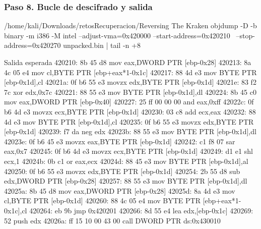 \documentclass[11pt,a4paper]{article}
\begin{document}
\subsubsection*{Paso 8. Bucle de descifrado y salida}
\begin{comando}{/home/kali/Downloads/retosRecuperacion/Reversing The Kraken}
objdump -D -b binary -m i386 -M intel --adjust-vma=0x420000 --start-address=0x420210 \
  --stop-address=0x420270 unpacked.bin | tail -n +8
\end{comando}
\begin{salidan}{Salida esperada}
  420210:       8b 45 d8                mov    eax,DWORD PTR [ebp-0x28]
  420213:       8a 4c 05 e4             mov    cl,BYTE PTR [ebp+eax*1-0x1c]
  420217:       88 4d e3                mov    BYTE PTR [ebp-0x1d],cl
  42021a:       0f b6 55 e3             movzx  edx,BYTE PTR [ebp-0x1d]
  42021e:       83 f2 7c                xor    edx,0x7c
  420221:       88 55 e3                mov    BYTE PTR [ebp-0x1d],dl
  420224:       8b 45 c0                mov    eax,DWORD PTR [ebp-0x40]
  420227:       25 ff 00 00 00          and    eax,0xff
  42022c:       0f b6 4d e3             movzx  ecx,BYTE PTR [ebp-0x1d]
  420230:       03 c8                   add    ecx,eax
  420232:       88 4d e3                mov    BYTE PTR [ebp-0x1d],cl
  420235:       0f b6 55 e3             movzx  edx,BYTE PTR [ebp-0x1d]
  420239:       f7 da                   neg    edx
  42023b:       88 55 e3                mov    BYTE PTR [ebp-0x1d],dl
  42023e:       0f b6 45 e3             movzx  eax,BYTE PTR [ebp-0x1d]
  420242:       c1 f8 07                sar    eax,0x7
  420245:       0f b6 4d e3             movzx  ecx,BYTE PTR [ebp-0x1d]
  420249:       d1 e1                   shl    ecx,1
  42024b:       0b c1                   or     eax,ecx
  42024d:       88 45 e3                mov    BYTE PTR [ebp-0x1d],al
  420250:       0f b6 55 e3             movzx  edx,BYTE PTR [ebp-0x1d]
  420254:       2b 55 d8                sub    edx,DWORD PTR [ebp-0x28]
  420257:       88 55 e3                mov    BYTE PTR [ebp-0x1d],dl
  42025a:       8b 45 d8                mov    eax,DWORD PTR [ebp-0x28]
  42025d:       8a 4d e3                mov    cl,BYTE PTR [ebp-0x1d]
  420260:       88 4c 05 e4             mov    BYTE PTR [ebp+eax*1-0x1c],cl
  420264:       eb 9b                   jmp    0x420201
  420266:       8d 55 e4                lea    edx,[ebp-0x1c]
  420269:       52                      push   edx
  42026a:       ff 15 10 00 43 00       call   DWORD PTR ds:0x430010
\end{salidan}
\end{document}
